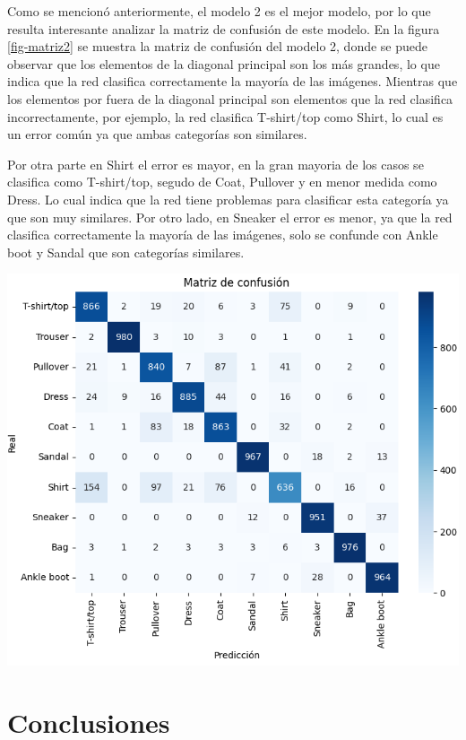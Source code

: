 \documentclass[aps,prl,reprint,groupedaddress]{revtex4-2}
\newenvironment{Figura}
  {\par\medskip\noindent\minipage{\linewidth}}
  {\endminipage\par\medskip}
\begin{document}
Como se mencionó anteriormente, el modelo 2 es el mejor modelo, por lo que 
resulta interesante analizar la matriz de confusión de este modelo. En la
figura \ref{fig-matriz2} se muestra la matriz de confusión del modelo 2, donde
se puede observar que los elementos de la diagonal principal son los más
grandes, lo que indica que la red clasifica correctamente la mayoría de las
imágenes. Mientras que los elementos por fuera de la diagonal principal son 
elementos que la red clasifica incorrectamente, por ejemplo, la red clasifica 
T-shirt/top como Shirt, lo cual es un error común ya que ambas categorías son
similares.

Por otra parte en Shirt el error es mayor, en la gran mayoria de los casos 
se clasifica como T-shirt/top, segudo de Coat, Pullover y en menor medida
como Dress. Lo cual indica que la red tiene problemas para clasificar esta 
categoría ya que son muy similares. Por otro lado, en Sneaker el error es menor, 
ya que la red clasifica correctamente la mayoría de las imágenes, solo se confunde 
con Ankle boot y Sandal que son categorías similares.

\begin{Figura}
  \centering
  \includegraphics[width=1\textwidth]{figs/matrix_model2.png}
  \label{fig-matriz2}
\end{Figura}

\section{Conclusiones}
\end{document}
